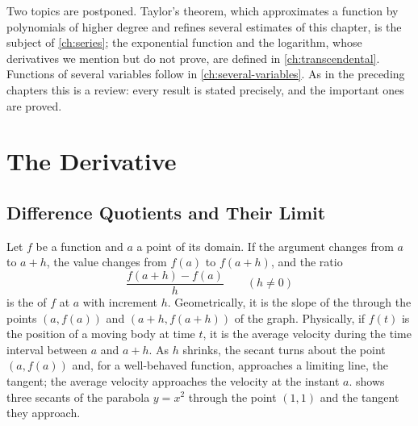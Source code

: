 Two topics are postponed. Taylor's theorem, which approximates a function by polynomials of higher degree and refines several estimates of this chapter, is the subject of \cref{ch:series}; the exponential function and the logarithm, whose derivatives we mention but do not prove, are defined in \cref{ch:transcendental}. Functions of several variables follow in \cref{ch:several-variables}. As in the preceding chapters this is a review: every result is stated precisely, and the important ones are proved.

\section{The Derivative}
\label{sec:derivative}

\subsection{Difference Quotients and Their Limit}

Let $f$ be a function and $a$ a point of its domain. If the argument changes from $a$ to $a+h$, the value changes from $f(a)$ to $f(a+h)$, and the ratio
\[
\frac{f(a+h)-f(a)}{h}\qquad(h\ne0)
\]
is the  of $f$ at $a$ with increment $h$. Geometrically, it is the slope of the  through the points $(a,f(a))$ and $(a+h,f(a+h))$ of the graph. Physically, if $f(t)$ is the position of a moving body at time $t$, it is the average velocity during the time interval between $a$ and $a+h$. As $h$ shrinks, the secant turns about the point $(a,f(a))$ and, for a well-behaved function, approaches a limiting line, the tangent; the average velocity approaches the velocity at the instant $a$.  shows three secants of the parabola $y=x^2$ through the point $(1,1)$ and the tangent they approach.

\begin{figure}
\end{figure}

